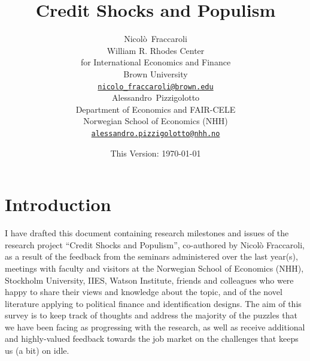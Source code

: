 \documentclass[11pt]{article}
\date{This Version: \today}
\title{Credit Shocks and Populism}
\author{
    {Nicolò~Fraccaroli} \\
    William R. Rhodes Center\\
    for International Economics and Finance\\
    Brown University\\
    \href{mailto:nicolo_fraccaroli@brown.edu}{\texttt{nicolo\_fraccaroli@brown.edu}} \\
    \And
    {Alessandro~Pizzigolotto} \\
    Department of Economics and FAIR-CELE\\
    Norwegian School of Economics (NHH)\\
    \href{mailto:alessandro.pizzigolotto@nhh.no}{\texttt{alessandro.pizzigolotto@nhh.no}} \\
}
\begin{document}
\maketitle

\renewcommand{\thefootnote}{\arabic{footnote}}
\setcounter{footnote}{0} 









\section{Introduction}\label{sec:introduction}

I have drafted this document containing research milestones and issues of the research project ``Credit Shocks and Populism'', co-authored by Nicolò Fraccaroli, as a result of the feedback from the seminars administered over the last year(s), meetings with faculty and visitors at the Norwegian School of Economics (NHH), Stockholm University, IIES, Watson Institute, friends and colleagues who were happy to share their views and knowledge about the topic, and of the novel literature applying to political finance and identification designs. The aim of this survey is to keep track of thoughts and address the majority of the puzzles that we have been facing as progressing with the research, as well as receive additional and highly-valued feedback towards the job market on the challenges that keeps us (a bit) on idle. 
\end{document}
